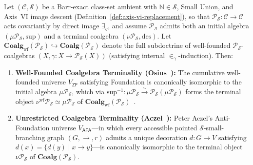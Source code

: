 \begin{theorem}\label{thm:axis-vii-foundation}%
%
\leanwitness%
%
Let $(\mathcal{C}, \mathcal{S})$ be a Barr-exact class-set ambient with $\mathbb{N} \in \mathcal{S}$, Small Union, and Axis~VI image descent (Definition~\ref{def:axis-vi-replacement}), so that $\mathcal{P}_{\mathcal{S}} : \mathcal{C} \to \mathcal{C}$ acts covariantly by direct image $\exists_g$, and assume $\mathcal{P}_{\mathcal{S}}$ admits both an initial algebra $(\mu \mathcal{P}_{\mathcal{S}}, \mathrm{sup})$ and a terminal coalgebra $(\nu \mathcal{P}_{\mathcal{S}}, \mathrm{des})$. Let $\mathbf{Coalg}_{\mathrm{wf}}(\mathcal{P}_{\mathcal{S}}) \hookrightarrow \mathbf{Coalg}(\mathcal{P}_{\mathcal{S}})$ denote the full subdoctrine of well-founded $\mathcal{P}_{\mathcal{S}}$-coalgebras $(X, \gamma : X \to \mathcal{P}_{\mathcal{S}}(X))$ (satisfying internal $\in_\gamma$-induction). Then:
\begin{enumerate}[label=\textup{(\roman*)},leftmargin=1.8em]
  \item \textbf{Well-Founded Coalgebra Terminality (Osius~\cite{Osius74}):} The cumulative well-founded universe $V_{\mathsf{ZF}}$ satisfying Foundation is canonically isomorphic to the initial algebra $\mu \mathcal{P}_{\mathcal{S}}$, which via $\mathrm{sup}^{-1} : \mu \mathcal{P}_{\mathcal{S}} \xrightarrow{\sim} \mathcal{P}_{\mathcal{S}}(\mu \mathcal{P}_{\mathcal{S}})$ forms the terminal object $\nu^{\mathrm{wf}} \mathcal{P}_{\mathcal{S}} \simeq \mu \mathcal{P}_{\mathcal{S}}$ of $\mathbf{Coalg}_{\mathrm{wf}}(\mathcal{P}_{\mathcal{S}})$~\cite[Chs.~II--III]{JoyalMoerdijk95}.
  \item \textbf{Unrestricted Coalgebra Terminality (Aczel~\cite[Chs.~1--2, 6--7]{Aczel88}):} Peter Aczel's Anti-Foundation universe $V_{\mathsf{AFA}}$---in which every accessible pointed $\mathcal{S}$-small-branching graph $(G, \to, r)$ admits a unique decoration $d : G \to V$ satisfying $d(x) = \{d(y) \mid x \to y\}$---is canonically isomorphic to the terminal object $\nu \mathcal{P}_{\mathcal{S}}$ of $\mathbf{Coalg}(\mathcal{P}_{\mathcal{S}})$.

\end{enumerate}
\end{theorem}
